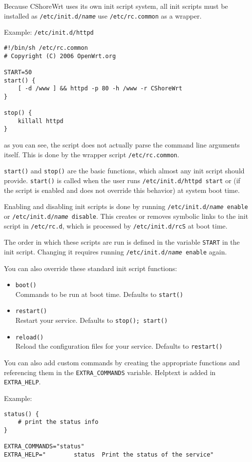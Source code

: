 Because CShoreWrt uses its own init script system, all init scripts must be installed
as \texttt{/etc/init.d/\textit{name}} use \texttt{/etc/rc.common} as a wrapper.

Example: \texttt{/etc/init.d/httpd}

\begin{Verbatim}
#!/bin/sh /etc/rc.common
# Copyright (C) 2006 OpenWrt.org

START=50
start() {
    [ -d /www ] && httpd -p 80 -h /www -r CShoreWrt
}

stop() {
    killall httpd
}
\end{Verbatim}

as you can see, the script does not actually parse the command line arguments itself.
This is done by the wrapper script \texttt{/etc/rc.common}.

\texttt{start()} and \texttt{stop()} are the basic functions, which almost any init
script should provide. \texttt{start()} is called when the user runs \texttt{/etc/init.d/httpd start}
or (if the script is enabled and does not override this behavior) at system boot time.

Enabling and disabling init scripts is done by running \texttt{/etc/init.d/\textit{name} enable}
or \texttt{/etc/init.d/\textit{name} disable}. This creates or removes symbolic links to the
init script in \texttt{/etc/rc.d}, which is processed by \texttt{/etc/init.d/rcS} at boot time.

The order in which these scripts are run is defined in the variable \texttt{START} in the init
script. Changing it requires running \texttt{/etc/init.d/\textit{name} enable} again.

You can also override these standard init script functions:
\begin{itemize}
    \item \texttt{boot()} \\
        Commands to be run at boot time. Defaults to \texttt{start()}

    \item \texttt{restart()} \\
        Restart your service. Defaults to \texttt{stop(); start()}

    \item \texttt{reload()} \\
        Reload the configuration files for your service. Defaults to \texttt{restart()}

\end{itemize}

You can also add custom commands by creating the appropriate functions and referencing them
in the \texttt{EXTRA\_COMMANDS} variable. Helptext is added in \texttt{EXTRA\_HELP}.

Example:

\begin{Verbatim}
status() {
    # print the status info
}

EXTRA_COMMANDS="status"
EXTRA_HELP="        status  Print the status of the service"
\end{Verbatim}

